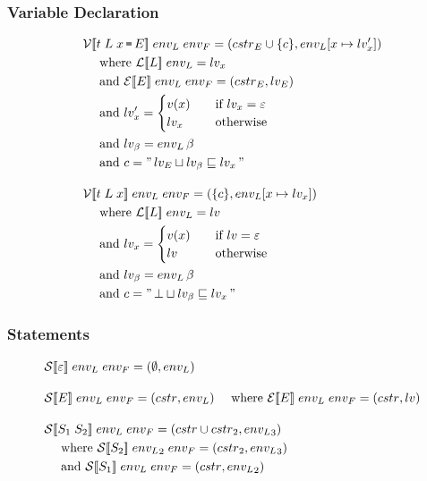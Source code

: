 \subsubsection{Variable Declaration}
\begin{align*}
  & \iV\dblSq{t \; L \; x \tk = E} \; \ienvL \; \ienvF = (\icstr_E \cup \{ c \}, \ienvL[x \mapsto \ilv_x']) \\
  & \dsWhere{\iL\dblSq{L} \; \ienvL = \ilv_x} \\
  & \dsAnd{\iE\dblSq{E} \; \ienvL \; \ienvF = (\icstr_E, \ilv_E)} \\
  & \dsAnd{\ilv_x' = \begin{cases}
  v(x) & \quad \text{if } \ilv_x = \varepsilon \\
  \ilv_x & \quad \text{otherwise}
  \end{cases}} \\
  & \dsAnd{\ilv_\ib = \ienvL \, \ib} \\
  & \dsAnd{c = \literal{\ilv_E \sqcup \ilv_\ib \sqsubseteq \ilv_x}} \rspace
  & \iV\dblSq{t \; L \; x} \; \ienvL \; \ienvF = (\{ c \}, \ienvL[x \mapsto \ilv_x])\\
  & \dsWhere{\iL\dblSq{L} \; \ienvL = \ilv} \\
  & \dsAnd{\ilv_x = \begin{cases}
  v(x) & \quad \text{if } \ilv = \varepsilon \\
  \ilv & \quad \text{otherwise}
  \end{cases}} \\
  & \dsAnd{\ilv_\ib = \ienvL \, \ib} \\
  & \dsAnd{c = \literal{\bot \sqcup \ilv_\ib \sqsubseteq \ilv_x}}
\end{align*}

\subsubsection{Statements}

\begin{align*}
& \iS\dblSq{\varepsilon} \; \ienvL \; \ienvF = (\emptyset, \ienvL) \rspace
%
& \iS\dblSq{E} \; \ienvL \; \ienvF = (\icstr, \ienvL) \dsWhere{\iE\dblSq{E} \; \ienvL \; \ienvF = (\icstr, \ilv)} \rspace
%
& \iS\dblSq{S_1 \; S_2} \; \ienvL \; \ienvF = (\icstr \cup \icstr_2, \ienvL_3) \\
& \dsWhere{\iS\dblSq{S_2} \; \ienvL_2 \; \ienvF = (\icstr_2, \ienvL_3)} \\
& \dsAnd{\iS\dblSq{S_1} \; \ienvL \; \ienvF = (\icstr, \ienvL_2)}
\end{align*}

